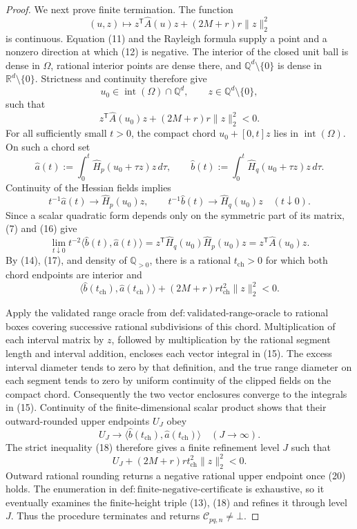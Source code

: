 \documentclass{article}
\begin{document}
\begin{proof}
We next prove finite termination.  The function
\[
 (u,z)\longmapsto
 z^{\mathsf T}\widehat A(u)z+(2M+r)r\lVert z\rVert_2^2
 \tag{12}
\]
is continuous.  Equation (11) and the Rayleigh formula supply a point and a nonzero direction at which (12) is negative.  The interior of the closed unit ball is dense in \(\Omega\), rational interior points are dense there, and \(\mathbb Q^d\setminus\{0\}\) is dense in \(\mathbb R^d\setminus\{0\}\).  Strictness and continuity therefore give
\[
 u_0\in\operatorname{int}(\Omega)\cap\mathbb Q^d,
 \qquad z\in\mathbb Q^d\setminus\{0\},
 \tag{13}
\]
such that
\[
 z^{\mathsf T}\widehat A(u_0)z
 +(2M+r)r\lVert z\rVert_2^2<0.
 \tag{14}
\]
For all sufficiently small \(t>0\), the compact chord \(u_0+[0,t]z\) lies in \(\operatorname{int}(\Omega)\).  On such a chord set
\[
 \widehat a(t):=\int_0^t\widehat H_p(u_0+\tau z)z\,d\tau,
 \qquad
 \widehat b(t):=\int_0^t\widehat H_q(u_0+\tau z)z\,d\tau.
 \tag{15}
\]
Continuity of the Hessian fields implies
\[
 t^{-1}\widehat a(t)\longrightarrow\widehat H_p(u_0)z,
 \qquad
 t^{-1}\widehat b(t)\longrightarrow\widehat H_q(u_0)z
 \quad(t\downarrow0).
 \tag{16}
\]
Since a scalar quadratic form depends only on the symmetric part of its matrix, (7) and (16) give
\[
 \lim_{t\downarrow0}t^{-2}
 \langle\widehat b(t),\widehat a(t)\rangle
 =z^{\mathsf T}\widehat H_q(u_0)\widehat H_p(u_0)z
 =z^{\mathsf T}\widehat A(u_0)z.
 \tag{17}
\]
By (14), (17), and density of \(\mathbb Q_{>0}\), there is a rational \(t_{\mathrm{ch}}>0\) for which both chord endpoints are interior and
\[
 \langle\widehat b(t_{\mathrm{ch}}),
          \widehat a(t_{\mathrm{ch}})\rangle
 +(2M+r)r t_{\mathrm{ch}}^2\lVert z\rVert_2^2<0.
 \tag{18}
\]

Apply the validated range oracle from \(\mathrm{def:validated\text{-}range\text{-}oracle}\) to rational boxes covering successive rational subdivisions of this chord.  Multiplication of each interval matrix by \(z\), followed by multiplication by the rational segment length and interval addition, encloses each vector integral in (15).  The excess interval diameter tends to zero by that definition, and the true range diameter on each segment tends to zero by uniform continuity of the clipped fields on the compact chord.  Consequently the two vector enclosures converge to the integrals in (15).  Continuity of the finite-dimensional scalar product shows that their outward-rounded upper endpoints \(U_J\) obey
\[
 U_J\longrightarrow
 \langle\widehat b(t_{\mathrm{ch}}),
          \widehat a(t_{\mathrm{ch}})\rangle
 \quad(J\to\infty).
 \tag{19}
\]
The strict inequality (18) therefore gives a finite refinement level \(J\) such that
\[
 U_J+(2M+r)r t_{\mathrm{ch}}^2\lVert z\rVert_2^2<0.
 \tag{20}
\]
Outward rational rounding returns a negative rational upper endpoint once (20) holds.  The enumeration in \(\mathrm{def:finite\text{-}negative\text{-}certificate}\) is exhaustive, so it eventually examines the finite-height triple (13), (18) and refines it through level \(J\).  Thus the procedure terminates and returns \(\mathcal C_{pq,n}\ne\bot\).


\end{proof}
\end{document}
